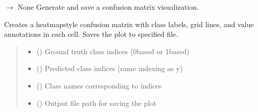 \documentclass[letterpaper,10pt,english]{sphinxmanual}
\begin{document}
\begin{fulllineitems}
\label{\detokenize{autoapi/src/Utils/index:src.Utils.plot_confusion_matrix}}
\pysigstartsignatures
\pysiglinewithargsret
{}
{\sphinxparamcomma {}\sphinxparamcomma {}\sphinxparamcomma {}\sphinxparamcomma {}}
{{ $\rightarrow$ None}}
\pysigstopsignatures
\sphinxAtStartPar
Generate and save a confusion matrix visualization.

\sphinxAtStartPar
Creates a heatmap\sphinxhyphen{}style confusion matrix with class labels, grid lines,
and value annotations in each cell. Saves the plot to specified file.
\begin{quote}\begin{description}
\begin{itemize}
\item {} 
\sphinxAtStartPar
{} () \textendash{} Ground truth class indices (0\sphinxhyphen{}based or 1\sphinxhyphen{}based)

\item {} 
\sphinxAtStartPar
{} () \textendash{} Predicted class indices (same indexing as y)

\item {} 
\sphinxAtStartPar
{} (\sphinxstyleliteralemphasis{\sphinxupquote{{[}}}\sphinxstyleliteralemphasis{\sphinxupquote{{]}}}) \textendash{} Class names corresponding to indices

\item {} 
\sphinxAtStartPar
{} () \textendash{} Output file path for saving the plot


\end{itemize}
\end{description}
\end{quote}
\end{fulllineitems}
\end{document}
